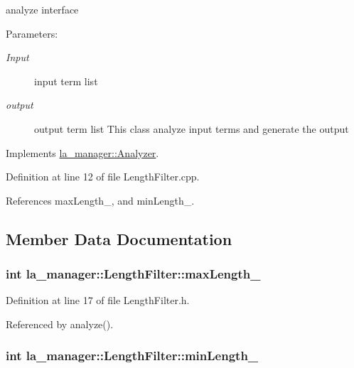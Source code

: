 analyze interface 

\begin{Desc}
\item[Parameters:]
\begin{description}
\item[{\em Input}]input term list \item[{\em output}]output term list This class analyze input terms and generate the output \end{description}
\end{Desc}


Implements \hyperlink{classla__manager_1_1Analyzer_a096ba4b2faeaa0f3938d7b826ab1c78}{la\_\-manager::Analyzer}.

Definition at line 12 of file LengthFilter.cpp.

References maxLength\_\-, and minLength\_\-.

\subsection{Member Data Documentation}
\hypertarget{classla__manager_1_1LengthFilter_1084f2cadc0a1ddf0143e52adc56200a}{
\subsubsection[{maxLength\_\-}]{\setlength{\rightskip}{0pt plus 5cm}int {\bf la\_\-manager::LengthFilter::maxLength\_\-}}}
\label{classla__manager_1_1LengthFilter_1084f2cadc0a1ddf0143e52adc56200a}




Definition at line 17 of file LengthFilter.h.

Referenced by analyze().\hypertarget{classla__manager_1_1LengthFilter_e780693a4bf6ef4d416b9cbe500d8e3b}{
\subsubsection[{minLength\_\-}]{\setlength{\rightskip}{0pt plus 5cm}int {\bf la\_\-manager::LengthFilter::minLength\_\-}}}
\label{classla__manager_1_1LengthFilter_e780693a4bf6ef4d416b9cbe500d8e3b}




